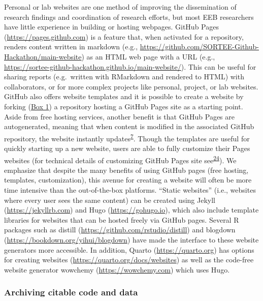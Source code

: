 Personal or lab websites are one method of improving the dissemination of research findings and coordination of research efforts, but most EEB researchers have little experience in building or hosting webpages.
GitHub Pages (\url{https://pages.github.com}) is a feature that, when activated for a repository, renders content written in markdown (e.g., \url{https://github.com/SORTEE-Github-Hackathon/main-website}) as an HTML web page with a URL (e.g., \url{https://sortee-github-hackathon.github.io/main-website/}).
This can be useful for sharing reports (e.g.~written with RMarkdown and rendered to HTML) with collaborators, or for more complex projects like personal, project, or lab websites.
GitHub also offers website templates and it is possible to create a website by forking (\protect\hyperlink{definitions}{Box 1}) a repository hosting a GitHub Pages site as a starting point.
Aside from free hosting services, another benefit is that GitHub Pages are autogenerated, meaning that when content is modified in the associated GitHub repository, the website instantly updates\textsuperscript{\protect\hyperlink{ref-RVetqmsg}{7}}.
Though the templates are useful for quickly starting up a new website, users are able to fully customize their Pages websites (for technical details of customizing GitHub Pages site see\textsuperscript{\protect\hyperlink{ref-MXxgZJ45}{24}}).
We emphasize that despite the many benefits of using GitHub pages (free hosting, templates, customization), this avenue for creating a website will often be more time intensive than the out-of-the-box platforms. ``Static websites'' (i.e., websites where every user sees the same content) can be created using Jekyll (\url{https://jekyllrb.com}) and Hugo (\url{https://gohugo.io}), which also include template libraries for websites that can be hosted freely via GitHub pages.
Several R packages such as distill (\url{https://github.com/rstudio/distill}) and blogdown (\url{https://bookdown.org/yihui/blogdown}) have made the interface to these website generators more accessible.
In addition, Quarto (\url{https://quarto.org}) has options for creating websites (\url{https://quarto.org/docs/websites}) as well as the code-free website generator wowchemy (\url{https://wowchemy.com}) which uses Hugo.

\hypertarget{archiving-citable-code-and-data}{%
\subsubsection{Archiving citable code and data}\label{archiving-citable-code-and-data}}

